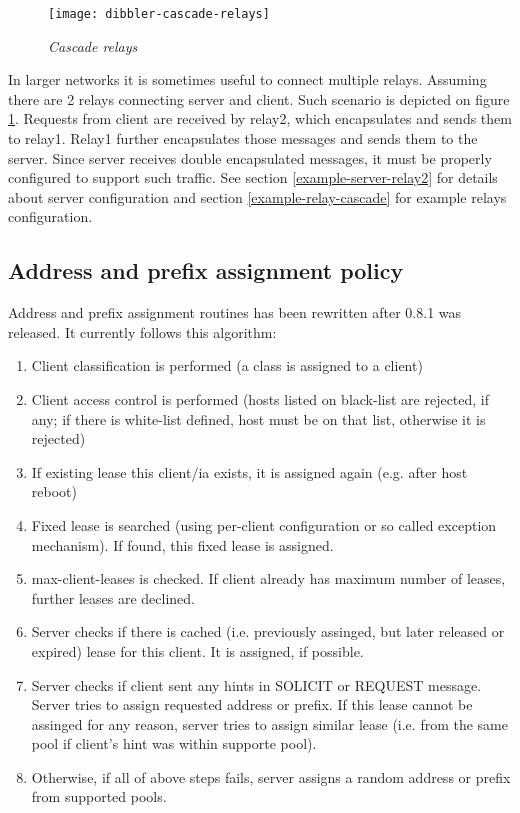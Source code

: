 \begin{figure}[ht]
\begin{center}
\texttt{[image: dibbler-cascade-relays]}
\caption{\emph{Cascade relays}}
\label{fig-cascade-relays}
\end{center}
\end{figure}

In larger networks it is sometimes useful to connect multiple
relays. Assuming there are 2 relays connecting server and client. Such
scenario is depicted on figure \ref{fig-cascade-relays}. Requests from
client are received by relay2, which encapsulates and sends them to
relay1. Relay1 further encapsulates those messages and sends them to
the server. Since server receives double encapsulated messages, it
must be properly configured to support such traffic. See section
\ref{example-server-relay2} for details about server configuration and
section \ref{example-relay-cascade} for example relays configuration.

\subsection{Address and prefix assignment policy}

Address and prefix assignment routines has been rewritten after 0.8.1
was released. It currently follows this algorithm:

\begin{enumerate}
\item Client classification is performed (a class is assigned to a client)
\item Client access control is performed (hosts listed on black-list are rejected,
  if any; if there is white-list defined, host must be on that list,
  otherwise it is rejected)
\item If existing lease this client/ia exists, it is assigned again
  (e.g. after host reboot)
\item Fixed lease is searched (using per-client configuration or so
  called exception mechanism). If found, this fixed lease is assigned.
\item max-client-leases is checked. If client already has maximum
  number of leases, further leases are declined.
\item Server checks if there is cached (i.e. previously assinged, but
  later released or expired) lease for this client. It is assigned, if
  possible.
\item Server checks if client sent any hints in SOLICIT or REQUEST
  message. Server tries to assign requested address or prefix. If this lease cannot be
  assinged for any reason, server tries to assign similar lease
  (i.e. from the same pool if client's hint was within supporte
  pool).
\item Otherwise, if all of above steps fails, server assigns a random
  address or prefix from supported pools.
\end{enumerate}


